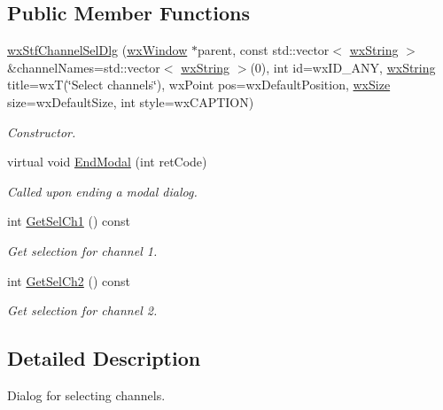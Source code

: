 \subsection*{Public Member Functions}
\begin{DoxyCompactItemize}
\item 
\hyperlink{classwxStfChannelSelDlg_ab3a13cce72ce68940804f2cad0a08322}{wxStfChannelSelDlg} (\hyperlink{classwxWindow}{wxWindow} $\ast$parent, const std::vector$<$ \hyperlink{classwxString}{wxString} $>$ \&channelNames=std::vector$<$ \hyperlink{classwxString}{wxString} $>$(0), int id=wxID\_\-ANY, \hyperlink{classwxString}{wxString} title=wxT(\char`\"{}Select channels\char`\"{}), wxPoint pos=wxDefaultPosition, \hyperlink{classwxSize}{wxSize} size=wxDefaultSize, int style=wxCAPTION)
\begin{DoxyCompactList}\small\item\em Constructor. \item\end{DoxyCompactList}\item 
virtual void \hyperlink{classwxStfChannelSelDlg_acd4e03d717bf7f53b248dee9efbf67b5}{EndModal} (int retCode)
\begin{DoxyCompactList}\small\item\em Called upon ending a modal dialog. \item\end{DoxyCompactList}\item 
int \hyperlink{classwxStfChannelSelDlg_a4411792835ba28251e7f25f217a37ec1}{GetSelCh1} () const 
\begin{DoxyCompactList}\small\item\em Get selection for channel 1. \item\end{DoxyCompactList}\item 
int \hyperlink{classwxStfChannelSelDlg_a55f484d5a236a7da3d40f266ec805952}{GetSelCh2} () const 
\begin{DoxyCompactList}\small\item\em Get selection for channel 2. \item\end{DoxyCompactList}\end{DoxyCompactItemize}


\subsection{Detailed Description}
Dialog for selecting channels. 

